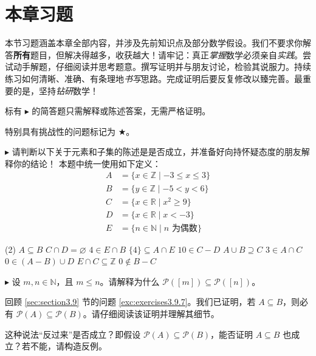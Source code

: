 \section{本章习题}

本节习题涵盖本章全部内容，并涉及先前知识点及部分数学假设。我们不要求你解答\textbf{所有}题目，但解决得越多，收获越大！请牢记：真正\emph{掌握}数学必须亲自\emph{实践}。尝试动手解题，仔细阅读并思考题意。撰写证明并与朋友讨论，检验其说服力。持续练习如何清晰、准确、有条理地\emph{书写}思路。完成证明后要反复修改以臻完善。最重要的是，坚持\emph{钻研}数学！

标有 $\blacktriangleright$ 的简答题只需解释或陈述答案，无需严格证明。

特别具有挑战性的问题标记为 $\bigstar$。

\begin{exercise}
    $\blacktriangleright$ 请判断以下关于元素和子集的陈述是是否成立，并准备好向持怀疑态度的朋友解释你的结论！
    本题中统一使用如下定义：
    \begin{align*}
        A &= \{x \in \mathbb{Z} \mid -3 \le x \le 3\} \\
        B &= \{y \in \mathbb{Z} \mid -5 < y < 6\} \\
        C &= \{x \in \mathbb{R} \mid x^2 \ge 9\} \\
	    D &= \{x \in \mathbb{R} \mid x < -3\} \\
        E &= \{n \in \mathbb{N} \mid n \text{\ 为偶数} \}
    \end{align*}
    \begin{tasks}(2)
        \task $A \subseteq B$
        \task $C \cap D = \varnothing$
        \task $4 \in E \cap B$
        \task $\{4\} \subseteq A \cap E$
        \task $10 \in C - D$
        \task $A \cup B \supseteq C$
        \task $3 \in A \cap C$
        \task $0 \in (A - B) \cup D$
        \task $E \cap C \subseteq \mathbb{Z}$
        \task $0 \notin B - C$
    \end{tasks}
\end{exercise}

\begin{exercise}
    $\blacktriangleright$ 设 $m, n \in \mathbb{N}$，且 $m \le n$。请解释为什么 $\mathcal{P}([m]) \subseteq \mathcal{P}([n])$。
\end{exercise}

\begin{exercise}
    回顾 \ref{sec:section3.9} 节的问题 \ref{exc:exercises3.9.7}。我们已证明，若 $A \subseteq B$，则必有 $\mathcal{P}(A) \subseteq \mathcal{P}(B)$。请仔细阅读该证明并理解其细节。

    这种说法``反过来''是否成立？即假设 $\mathcal{P}(A) \subseteq \mathcal{P}(B)$，能否证明 $A \subseteq B$ 也成立？若不能，请构造反例。
\end{exercise}

